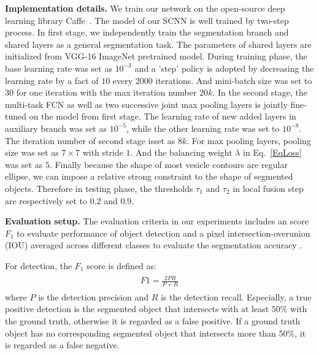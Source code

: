 \noindent\textbf{Implementation details.}
We train our network on the open-source deep learning library Caffe~\cite{Jia2014}.
The model of our SCNN is well trained by two-step process.
In first stage, we independently train the segmentation branch and shared layers as a general segmentation task.
The parameters of shared layers are initialized from VGG-16 ImageNet pretrained model.
During training phase, the base learning rate was set as $10^{-3}$ and a 'step' policy is adopted by decreasing the learning rate by a fact of $10$ every $2000$ iterations.
And mini-batch size was set to $30$ for one iteration with the max iteration number $20k$.
In the second stage, the multi-task FCN as well as two successive joint max pooling layers is jointly fine-tuned on the model from first stage.
The learning rate of new added layers in auxiliary branch was set as $10^{-5}$, while the other learning rate was set to $10^{-8}$.
The iteration number of second stage isset as $8k$.
For max pooling layers, pooling size was set as $7\times 7$ with stride $1$.
And the balancing weight $\lambda$ in Eq.~\ref{EqLoss} was set as $5$.
Finally because the shape of most vesicle contours are regular ellipse, we can impose a relative strong constraint to the shape of segmented objects.
Therefore in testing phase, the thresholds $\tau_1$ and $\tau_2$ in local fusion step are respectively set to $0.2$ and $0.9$.

\noindent\textbf{Evaluation setup.}
%
The evaluation criteria in our experiments includes an score $F_1$ to evaluate performance of object detection and a pixel intersection-overunion (IOU) averaged across different classes to evaluate the segmentation accuracy .

For detection, the $F_1$ score is defined as:
%
\begin{eqnarray}\label{fusion}
\begin{aligned}
F1 = \frac{2PR}{P+R}
\end{aligned}
\end{eqnarray}
where $P$ is the detection precision and $R$ is the detection recall.
Especially, a true positive detection is the segmented object that intersects with at least $50\%$ with the ground truth, otherwise it is regarded as a false positive.
If a ground truth object has no corresponding segmented object that intersects more than $50\%$, it is regarded as a false negative.

